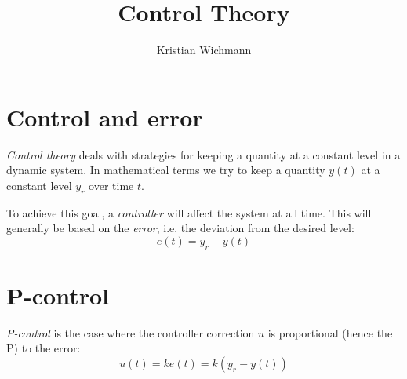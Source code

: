 \documentclass[12pt, a4paper]{article}
\title{Control Theory}
\author{Kristian Wichmann}
\numberwithin{equation}{section}
\begin{document}
\maketitle

\section{Control and error}
\emph{Control theory} deals with strategies for keeping a quantity at a constant level in a dynamic system. In mathematical terms we try to keep a quantity $y(t)$ at a constant level $y_r$ over time $t$.

To achieve this goal, a \emph{controller} will affect the system at all time. This will generally be based on the \emph{error}, i.e. the deviation from the desired level:
\begin{equation}
e(t)=y_r-y(t)
\end{equation}

\section{P-control}
\emph{P-control} is the case where the controller correction $u$ is proportional (hence the P) to the error:
\begin{equation}
u(t)=ke(t)=k(y_r-y(t))
\end{equation}
\end{document}
